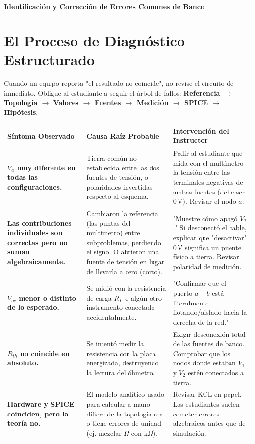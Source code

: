 \documentclass[11pt, a4paper]{article}
\begin{document}
\begin{tcolorbox}[colback=ucbblue!5!white, colframe=ucbblue, title=\textbf{Guía Docente: Diagnóstico Rápido de Discrepancias (Troubleshooting)}]
    \centering \textbf{Identificación y Corrección de Errores Comunes de Banco}
\end{tcolorbox}

\section*{El Proceso de Diagnóstico Estructurado}
Cuando un equipo reporta "el resultado no coincide", no revise el circuito de inmediato. Obligue al estudiante a seguir el árbol de fallos: \textbf{Referencia $\rightarrow$ Topología $\rightarrow$ Valores $\rightarrow$ Fuentes $\rightarrow$ Medición $\rightarrow$ SPICE $\rightarrow$ Hipótesis}.

\vspace{0.3cm}
\renewcommand{\arraystretch}{1.6}
\noindent
\begin{tabularx}{\textwidth}{|>{\bfseries\RaggedRight}p{3cm}|>{\RaggedRight\arraybackslash}X|>{\RaggedRight\arraybackslash}X|}
\hline
\rowcolor{ucbblue!10}
\textbf{Síntoma Observado} & \textbf{Causa Raíz Probable} & \textbf{Intervención del Instructor} \\ \hline
\textbf{$V_a$ muy diferente en todas las configuraciones.} & Tierra común no establecida entre las dos fuentes de tensión, o polaridades invertidas respecto al esquema. & Pedir al estudiante que mida con el multímetro la tensión entre las terminales negativas de ambas fuentes (debe ser $0\,\text{V}$). Revisar el nodo $a$. \\ \hline
\textbf{Las contribuciones individuales son correctas pero no suman algebraicamente.} & Cambiaron la referencia (las puntas del multímetro) entre subproblemas, perdiendo el signo. O abrieron una fuente de tensión en lugar de llevarla a cero (corto). & "Muestre cómo apagó $V_2$." Si desconectó el cable, explicar que "desactivar" $0\,\text{V}$ significa un puente físico a tierra. Revisar polaridad de medición. \\ \hline
\textbf{$V_{oc}$ menor o distinto de lo esperado.} & Se midió con la resistencia de carga $R_L$ o algún otro instrumento conectado accidentalmente. & "Confirmar que el puerto $a-b$ está literalmente flotando/aislado hacia la derecha de la red." \\ \hline
\textbf{$R_{th}$ no coincide en absoluto.} & Se intentó medir la resistencia con la placa energizada, destruyendo la lectura del óhmetro. & Exigir desconexión total de las fuentes de banco. Comprobar que los nodos donde estaban $V_1$ y $V_2$ estén conectados a tierra. \\ \hline
\textbf{Hardware y SPICE coinciden, pero la teoría no.} & El modelo analítico usado para calcular a mano difiere de la topología real o tiene errores de unidad (ej. mezclar $\Omega$ con $\text{k}\Omega$). & Revisar KCL en papel. Los estudiantes suelen cometer errores algebraicos antes que de simulación. \\ \hline
\end{tabularx}
\end{document}
